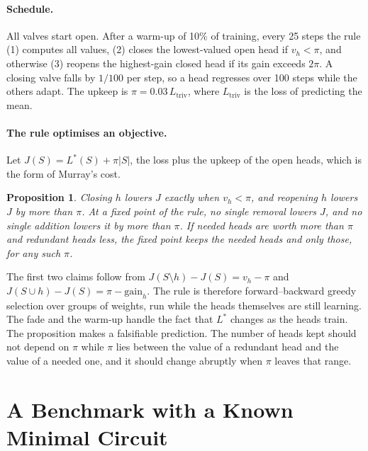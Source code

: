 \documentclass[letterpaper]{article} %
\newtheorem{proposition}{Proposition}
\newcommand{\Ltriv}{L_{\mathrm{triv}}}
\begin{document}
\paragraph{Schedule.} All valves start open. After a warm-up of 10\% of training, every 25 steps the rule (1) computes all values, (2) closes the lowest-valued open head if $v_h<\pi$, and otherwise (3) reopens the highest-gain closed head if its gain exceeds $2\pi$. A closing valve falls by $1/100$ per step, so a head regresses over 100 steps while the others adapt. The upkeep is $\pi=0.03\,\Ltriv$, where $\Ltriv$ is the loss of predicting the mean.

\paragraph{The rule optimises an objective.} Let $J(S)=L^\ast(S)+\pi|S|$, the loss plus the upkeep of the open heads, which is the form of Murray's cost.
\begin{proposition}
Closing $h$ lowers $J$ exactly when $v_h<\pi$, and reopening $h$ lowers $J$ by more than $\pi$. At a fixed point of the rule, no single removal lowers $J$, and no single addition lowers it by more than $\pi$. If needed heads are worth more than $\pi$ and redundant heads less, the fixed point keeps the needed heads and only those, for any such $\pi$.
\end{proposition}
The first two claims follow from $J(S\setminus h)-J(S)=v_h-\pi$ and $J(S\cup h)-J(S)=\pi-\mathrm{gain}_h$. The rule is therefore forward--backward greedy selection \citep{zhang2011foba} over groups of weights, run while the heads themselves are still learning. The fade and the warm-up handle the fact that $L^\ast$ changes as the heads train. The proposition makes a falsifiable prediction. The number of heads kept should not depend on $\pi$ while $\pi$ lies between the value of a redundant head and the value of a needed one, and it should change abruptly when $\pi$ leaves that range.

\section{A Benchmark with a Known Minimal Circuit}
\end{document}
